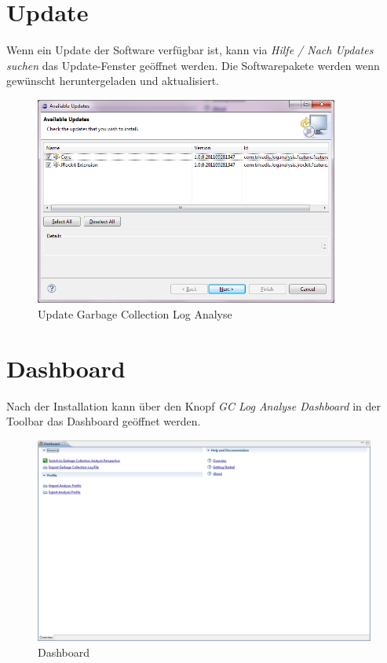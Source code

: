 \section{Update}
Wenn ein Update der Software verfügbar ist, kann via \textit{Hilfe / Nach Updates suchen} das Update-Fenster geöffnet werden. Die  Softwarepakete werden wenn gewünscht heruntergeladen und aktualisiert.
 \begin{figure}[H]
  	\centering
    	\includegraphics[width=10cm]{images/tutorial_update01}
        	\caption{Update Garbage Collection Log Analyse}
\end{figure}

\section{Dashboard}
Nach der Installation kann über den Knopf \textit{GC Log Analyse Dashboard} in der Toolbar das Dashboard geöffnet werden. 
 \begin{figure}[H]
  	\centering
    	\includegraphics[width=16cm]{images/tutorial_dashboard}
        	\caption{Dashboard}
\end{figure}


